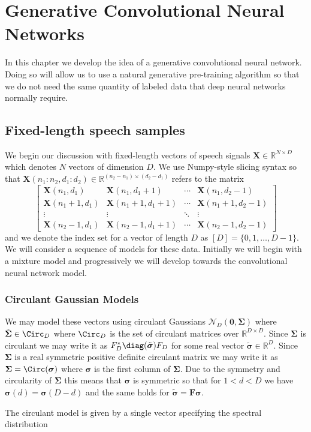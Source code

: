 \chapter{Generative Convolutional Neural Networks}

In this chapter we develop the idea of a generative convolutional neural
network.  Doing so will allow us to use a natural generative pre-training
algorithm so that we do not need the same quantity of labeled data
that deep neural networks normally require.

\section{Fixed-length speech samples}

We begin our discussion with fixed-length vectors of speech signals
$\mathbf{X}\in\mathbb{R}^{N\times D}$ which denotes $N$ vectors
of dimension $D$.  We use Numpy-style slicing syntax so that
$\mathbf{X}(n_1:n_2,d_1:d_2)\in \mathbb{R}^{(n_2-n_1)\times(d_2-d_1)}$
refers to the matrix
\begin{equation}
\begin{bmatrix}
  \mathbf{X}(n_1,d_1) & \mathbf{X}(n_1,d_1+1) & \cdots & \mathbf{X}(n_1,d_2-1)\\
  \mathbf{X}(n_1+1,d_1) & \mathbf{X}(n_1+1,d_1+1) & \cdots & \mathbf{X}(n_1+1,d_2-1)\\
  \vdots & \vdots & \ddots & \vdots \\
  \mathbf{X}(n_2-1,d_1) & \mathbf{X}(n_2-1,d_1+1) & \cdots & \mathbf{X}(n_2-1,d_2-1)
\end{bmatrix}
\end{equation}
and we denote the index set for a vector of length $D$ as $[D]=\{0,1,\ldots,D-1\}$. We will consider a sequence of models for these data.  Initially we will begin with 
a mixture model and progressively we will develop towards the convolutional neural network model.

\subsection{Circulant Gaussian Models}

We may model these vectors using circulant Gaussians $\mathcal{N}_D(\mathbf{0},\mathbf{\Sigma})$ where
$\tilde{\boldsymbol{\Sigma}}\in\Circ_D$ where $\Circ_D$ is the set of circulant matrices over $\mathbb{R}^{D\times D}$.
Since $\boldsymbol{\Sigma}$ is circulant we may write it as $F_D^*\diag(\tilde{\boldsymbol{\sigma}})F_D$ for some 
real vector $\tilde{\boldsymbol{\sigma}}\in\mathbb{R}^D$. Since $\boldsymbol{\Sigma}$ is a real symmetric
 positive definite circulant matrix we may write it as $\boldsymbol{\Sigma}=\Circ(\boldsymbol{\sigma})$
where $\boldsymbol{\sigma}$ is the first column of $\boldsymbol{\Sigma}$.  Due to the symmetry and circularity of
$\boldsymbol{\Sigma}$ this means that $\boldsymbol{\sigma}$ is symmetric so that for $1 < d < D$ we have
$\boldsymbol{\sigma}(d)=\boldsymbol{\sigma}(D-d)$ and the same holds for $\tilde{\boldsymbol{\sigma}}=\mathbf{F}\boldsymbol{\sigma}$.

The circulant model is given by a single vector specifying the spectral distribution
